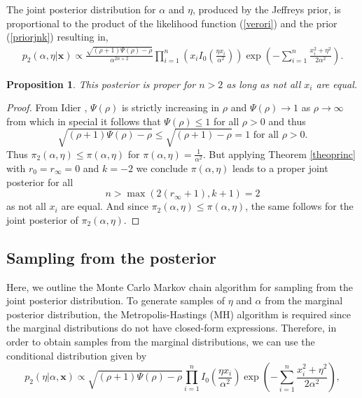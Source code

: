 \documentclass[12pt]{interact}
\theoremstyle{plain}%
\newtheorem{proposition}[theorem]{Proposition}
\theoremstyle{definition}
\theoremstyle{remark}
\begin{document}
The joint posterior distribution for $\alpha$ and $\eta$, produced by the Jeffreys prior, is proportional to the product of the likelihood function (\ref{verori}) and the prior (\ref{priorjnk}) resulting in,
\begin{equation}\label{postjnk1} 
\begin{aligned}
p_2(\alpha,\eta|\boldsymbol{x})\propto\frac{\sqrt{(\rho+1)\Psi(\rho)-\rho}}{\alpha^{2n+2}}\prod_{i=1}^{n}\left(x_iI_0\left( \frac{\eta x_i}{\alpha^2} \right)\right) \exp\left( -\sum_{i=1}^{n}\frac{x_i^2 + \eta^2}{2\alpha^2} \right). 
\end{aligned}
\end{equation}

\begin{proposition}\label{prop2} This posterior is proper for $n> 2$ as long as not all $x_i$ are equal.
\end{proposition}
\begin{proof} From Idier \cite{idier2014properties}, $\Psi(\rho)$ is strictly increasing in $\rho$ and $\Psi(\rho)\to 1$ as $\rho\to \infty$ from which in special it follows that $\Psi(\rho)\leq 1$ for all $\rho>0$ and thus
\begin{equation*}
\sqrt{(\rho+1)\Psi(\rho)-\rho}\leq \sqrt{(\rho+1) - \rho} = 1\mbox{ for all }\rho >0.
\end{equation*}
Thus $\pi_2(\alpha,\eta)\leq \pi(\alpha,\eta)$ for $\pi(\alpha,\eta)=\frac{1}{\alpha^2}$. But applying Theorem \ref{theoprinc} with $r_0=r_\infty=0$ and $k=-2$ we conclude $\pi(\alpha,\eta)$ leads to a proper joint posterior for all
\begin{equation*}n>\max(2(r_\infty+1),k+1)=2
\end{equation*}
as not all $x_i$ are equal. And since $\pi_2(\alpha,\eta)\leq \pi(\alpha,\eta)$, the same follows for the joint posterior of $\pi_2(\alpha,\eta)$.
\end{proof}

\subsection{Sampling from the posterior}

Here, we outline the Monte Carlo Markov chain algorithm for sampling from the joint posterior distribution.  To generate samples of $\eta$ and $\alpha$ from the marginal posterior distribution, the Metropolis-Hastings (MH) algorithm is required since the marginal distributions do not have closed-form expressions. Therefore, in order to obtain samples from the marginal distributions, we can use the conditional distribution given by 
\begin{equation}\label{cond1}
p_2(\eta|\alpha,\boldsymbol{x})\propto \sqrt{(\rho+1)\Psi(\rho)-\rho}\prod_{i=1}^{n}I_0\left( \frac{\eta x_i}{\alpha^2} \right) \exp\left( -\sum_{i=1}^{n}\frac{x_i^2 + \eta^2}{2\alpha^2} \right),\end{equation}
\end{document}
